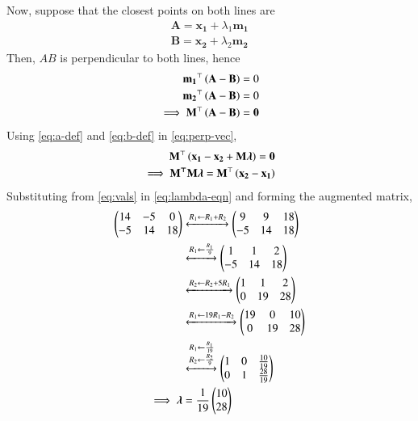 \documentclass[journal,12pt,twocolumn]{IEEEtran}
\renewcommand{\vec}[1]{\boldsymbol{\mathbf{#1}}}
\begin{document}
\begin{enumerate}
    Now, suppose that the closest points on both lines are
    \begin{align}
        \vec{A} = \vec{x_1} + \lambda_1\vec{m_1} \label{eq:a-def} \\
        \vec{B} = \vec{x_2} + \lambda_2\vec{m_2}
        \label{eq:b-def}
    \end{align}
    Then, $AB$ is perpendicular to both lines, hence
    \begin{align}
        \vec{m_1}^\top\brak{\vec{A}-\vec{B}} = 0 \\
        \vec{m_2}^\top\brak{\vec{A}-\vec{B}} = 0 \\
        \implies \vec{M}^\top\brak{\vec{A}-\vec{B}} = \vec{0}
        \label{eq:perp-vec}
    \end{align}
    Using \eqref{eq:a-def} and \eqref{eq:b-def} in \eqref{eq:perp-vec},
    \begin{align}
        \vec{M}^\top\brak{\vec{x_1}-\vec{x_2} + \vec{M}\vec{\lambda}} = \vec{0} \\
        \implies \vec{M^\top M\lambda} = \vec{M}^\top\brak{\vec{x_2}-\vec{x_1}}
        \label{eq:lambda-eqn}
    \end{align}
    Substituting from \eqref{eq:vals} in \eqref{eq:lambda-eqn} and forming the 
    augmented matrix,
    \begin{align}
        \myvec{14&-5&0\\-5&14&18} &\xleftrightarrow[]{R_1\leftarrow R_1+R_2} \myvec{9&9&18\\-5&14&18} \\
                 &\xleftrightarrow[]{R_1\leftarrow\frac{R_1}{9}} \myvec{1&1&2\\-5&14&18} \\
                 &\xleftrightarrow[]{R_2\leftarrow R_2+5R_1} \myvec{1&1&2\\0&19&28} \\
                 &\xleftrightarrow[]{R_1\leftarrow19R_1-R_2} \myvec{19&0&10\\0&19&28} \\
                 &\xleftrightarrow[]{\substack{R_1\leftarrow\frac{R_1}{19}\\R_2\leftarrow\frac{R_2}{9}}}
                    \myvec{1&0&\frac{10}{19}\\0&1&\frac{28}{19}} \\
                    \implies \vec{\lambda} &= \frac{1}{19}\myvec{10\\28}
        \label{eq:lambda-sol}
    \end{align}

\end{enumerate}
\end{document}
